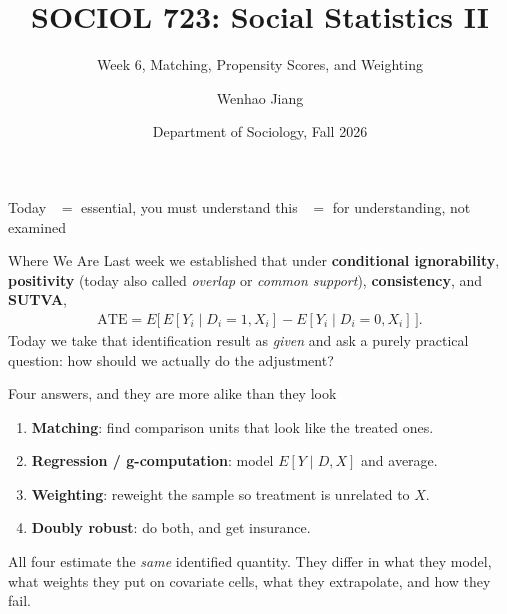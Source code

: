 \documentclass[aspectratio=169,11pt,xcolor=dvipsnames]{beamer}
\title[SOCIOL 723]{SOCIOL 723: Social Statistics II\\[-2pt]}
\subtitle{Week 6, Matching, Propensity Scores, and Weighting\\[-6pt]}
\author[Jiang]{Wenhao Jiang\vspace{-2.5em}}
\institute[Duke]{}
\date{Department of Sociology, Fall 2026}
\newcommand{\E}{E}
\newcommand{\adv}{\,\raisebox{0.6pt}{\textcolor{accent}{$\bigstar$}}}
\newcommand{\core}{\,\raisebox{0.6pt}{\textcolor{corestar}{$\bigstar$}}}
\begin{document}
\begin{frame}[plain]
  \titlepage
\end{frame}

\begin{frame}{Today}
  \tableofcontents
  \vskip6pt
  {\footnotesize \core{} $=$ essential, you must understand this \quad\quad \adv{} $=$ for understanding, not examined}
\end{frame}

\begin{frame}{Where We Are}
Last week we established that under \textbf{conditional ignorability},
\textbf{positivity} (today also called \emph{overlap} or \emph{common
support}), \textbf{consistency}, and \textbf{SUTVA},
\begin{align*}
  \text{ATE} = \E\Big[\,\E[Y_i\mid D_i=1,X_i] - \E[Y_i\mid D_i=0,X_i]\,\Big] .
\end{align*}
Today we take that identification result as \emph{given} and ask a purely
practical question: \alert{how should we actually do the adjustment?}
\vskip3pt
\begin{block}{Four answers, and they are more alike than they look}
\begin{enumerate}\itemsep1pt
  \item \textbf{Matching}: find comparison units that look like the treated ones.
  \item \textbf{Regression / g-computation}: model $\E[Y\mid D,X]$ and average.
  \item \textbf{Weighting}: reweight the sample so treatment is unrelated to $X$.
  \item \textbf{Doubly robust}: do both, and get insurance.
\end{enumerate}
\end{block}
\vskip2pt
All four estimate the \emph{same} identified quantity. They differ in what they
model, \alert{what weights they put on covariate cells}, what they extrapolate,
and how they fail.
\end{frame}
\end{document}
